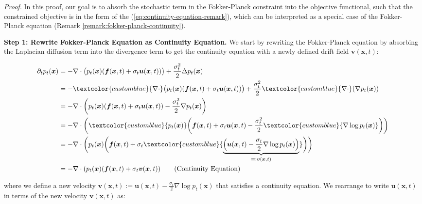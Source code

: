 \documentclass{article}
\newcommand{\bluetext}[1]{\textcolor{customblue}{#1}}
\begin{document}
\textit{Proof.} In this proof, our goal is to absorb the stochastic term in the Fokker-Planck constraint into the objective functional, such that the constrained objective is in the form of the (\ref{eq:continuity-equation-remark}), which can be interpreted as a special case of the Fokker-Planck equation (Remark \ref{remark:fokker-planck-continuity}). 

\textbf{Step 1: Rewrite Fokker-Planck Equation as Continuity Equation.} 
We start by rewriting the Fokker-Planck equation by absorbing the Laplacian diffusion term into the divergence term to get the continuity equation with a newly defined drift field $\boldsymbol{v}(\boldsymbol{x},t)$:
\begin{small}
\begin{align}
    \partial_tp_t(\boldsymbol{x})&=-\nabla\cdot\big(p_t(\boldsymbol{x})(\boldsymbol{f}(\boldsymbol{x},t) +\sigma_t\boldsymbol{u}(\boldsymbol{x},t))\big)+\frac{\sigma_t^2}{2}\Delta p_t(\boldsymbol{x})\nonumber\\
    &=-\bluetext{\nabla\cdot}\big(p_t(\boldsymbol{x})(\boldsymbol{f}(\boldsymbol{x},t) +\sigma_t\boldsymbol{u}(\boldsymbol{x},t))\big)+\frac{\sigma_t^2}{2}\bluetext{\nabla\cdot}(\nabla p_t(\boldsymbol{x}))\nonumber\\
    &=-\nabla\cdot\left(p_t(\boldsymbol{x})(\boldsymbol{f}(\boldsymbol{x},t) +\sigma_t\boldsymbol{u}(\boldsymbol{x},t))-\frac{\sigma_t^2}{2}\nabla p_t(\boldsymbol{x})\right)\nonumber\\
    &=-\nabla\cdot\bigg(\bluetext{p_t(\boldsymbol{x})}\bigg(\boldsymbol{f}(\boldsymbol{x},t) +\sigma_t\boldsymbol{u}(\boldsymbol{x},t)-\frac{\sigma_t^2}{2}\bluetext{\nabla \log p_t(\boldsymbol{x})}\bigg)\bigg)\nonumber\\
    &=-\nabla\cdot\bigg(p_t(\boldsymbol{x})\bigg(\boldsymbol{f}(\boldsymbol{x},t) +\sigma_t\bluetext{\underbrace{\left(\boldsymbol{u}(\boldsymbol{x},t)-\frac{\sigma_t}{2}\nabla \log p_t(\boldsymbol{x})\right)}_{=:\boldsymbol{v}(\boldsymbol{x},t)}}\bigg)\bigg)\nonumber\\
    &=-\nabla\cdot(p_t(\boldsymbol{x})(\boldsymbol{f}(\boldsymbol{x},t)+\sigma_t\boldsymbol{v}(\boldsymbol{x},t))\tag{Continuity Equation}\label{eq:entropy-dynamic-ot-proof1}
\end{align}
\end{small}
where we define a new velocity $\boldsymbol{v}(\boldsymbol{x},t):=\boldsymbol{u}(\boldsymbol{x},t)-\frac{\sigma_t}{2}\nabla \log p_t(\boldsymbol{x})$ that satisfies a continuity equation. We rearrange to write $\boldsymbol{u}(\boldsymbol{x},t)$ in terms of the new velocity $\boldsymbol{v}(\boldsymbol{x},t)$ as:
\end{document}
